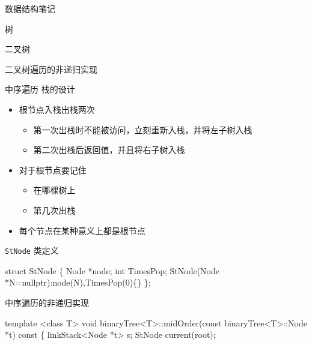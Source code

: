 \documentclass[
  ignorenonframetext,
]{beamer}
\newenvironment{Shaded}{}{}
\newcommand{\NormalTok}[1]{#1}
\providecommand{\tightlist}{%
  \setlength{\itemsep}{0pt}\setlength{\parskip}{0pt}}
\begin{document}
\begin{frame}[fragile]{数据结构笔记}
\begin{block}{树}
\begin{block}{二叉树}
\begin{block}{二叉树遍历的非递归实现}
\begin{block}{中序遍历}
栈的设计

\begin{itemize}
\tightlist
\item
  根节点入栈出栈两次

  \begin{itemize}
  \tightlist
  \item
    第一次出栈时不能被访问，立刻重新入栈，并将左子树入栈
  \item
    第二次出栈后返回值，并且将右子树入栈
  \end{itemize}
\item
  对于根节点要记住

  \begin{itemize}
  \tightlist
  \item
    在哪棵树上
  \item
    第几次出栈
  \end{itemize}
\item
  每个节点在某种意义上都是根节点
\end{itemize}

\begin{block}{\texttt{StNode} 类定义}
\protect{}\label{stnode-ux7c7bux5b9aux4e49}
\begin{Shaded}
\begin{Highlighting}[]
\NormalTok{struct StNode}
\NormalTok{\{}
\NormalTok{  Node *node;}
\NormalTok{  int TimesPop;}
\NormalTok{  StNode(Node *N=nullptr):node(N),TimesPop(0)\{\}}
\NormalTok{\};}
\end{Highlighting}
\end{Shaded}
\end{block}

\begin{block}{中序遍历的非递归实现}
\protect{}\label{ux4e2dux5e8fux904dux5386ux7684ux975eux9012ux5f52ux5b9eux73b0}
\begin{Shaded}
\begin{Highlighting}[]
\NormalTok{template \textless{}class T\textgreater{}}
\NormalTok{void binaryTree\textless{}T\textgreater{}::midOrder(const binaryTree\textless{}T\textgreater{}::Node *t) const}
\NormalTok{\{}
\NormalTok{  linkStack\textless{}Node *t\textgreater{} s;}
\NormalTok{  StNode current(root);}


\end{Highlighting}
\end{Shaded}
\end{block}
\end{block}
\end{block}
\end{block}
\end{block}
\end{frame}
\end{document}
